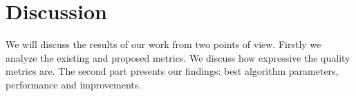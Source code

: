 \section{Discussion}\label{sec:DISCUSSION}

We will discuss the results of our work from two points of view.
Firstly we analyze the existing and proposed metrics.
We discuss how expressive the quality metrics are.
The second part presents our findings: best algorithm parameters, performance and improvements.